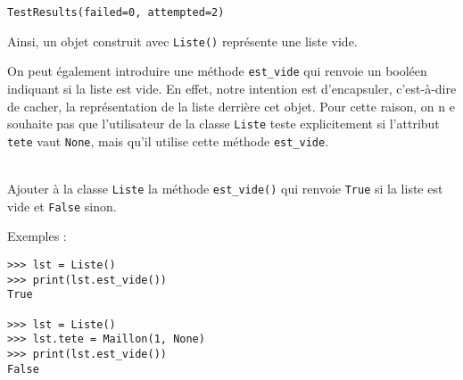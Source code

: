\documentclass[a4paper,17pt]{extarticle}
\makeatletter
\newenvironment{eleve}%
{\begin{activite}\color{noiramu}\\[-0.5cm]}
{\end{activite}}
\newcommand{\boxspacing}{\kern\kvtcb@left@rule\kern\kvtcb@boxsep}
\newcommand{\prompt}[4]{
        \ttfamily\llap{{\color{#2}[#3]:\hspace{3pt}#4}}\vspace{-\baselineskip}
    }
\makeatother
\begin{document}
            \begin{tcolorbox}[breakable, size=fbox, boxrule=.5pt, pad at break*=1mm, opacityfill=0]
\prompt{Out}{outcolor}{3}{\boxspacing}
\begin{Verbatim}[commandchars=\\\{\}]
TestResults(failed=0, attempted=2)
\end{Verbatim}
\end{tcolorbox}
        
    Ainsi, un objet construit avec \texttt{Liste()} représente une liste
vide.

On peut également introduire une méthode \texttt{est\_vide} qui renvoie
un booléen indiquant si la liste est vide. En effet, notre intention est
d'encapsuler, c'est-à-dire de cacher, la représentation de la liste
derrière cet objet. Pour cette raison, on n e souhaite pas que
l'utilisateur de la classe \texttt{Liste} teste explicitement si
l'attribut \texttt{tete} vaut \texttt{None}, mais qu'il utilise cette
méthode \texttt{est\_vide}.
\begin{eleve}
    Ajouter à la classe \texttt{Liste} la méthode \texttt{est\_vide()} qui
renvoie \texttt{True} si la liste est vide et \texttt{False} sinon.

Exemples :

\begin{verbatim}
>>> lst = Liste()
>>> print(lst.est_vide())
True

>>> lst = Liste()
>>> lst.tete = Maillon(1, None)
>>> print(lst.est_vide())
False
\end{verbatim}
        
        \end{eleve}
\end{document}
